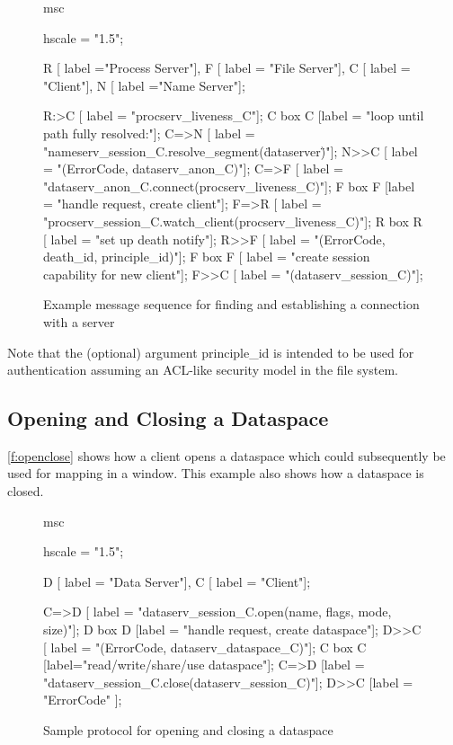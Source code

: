 \begin{figure}[htb]
  \begin{center}
    \begin{msc}
      msc {
        hscale = "1.5";

        R [ label ="Process Server"],
        F [ label = "File Server"],
        C [ label = "Client"],
        N [ label ="Name Server"];

        R:>C [ label = "procserv\_liveness\_C"];
        C box C [label = "loop until path fully resolved:"];
        C=>N [ label = "nameserv\_session\_C.resolve\_segment(\"dataserver\")"];
        N>>C [ label = "(ErrorCode, dataserv\_anon\_C)"];
        C=>F [ label = "dataserv\_anon\_C.connect(procserv\_liveness\_C)"];
        F box F [label = "handle request, create client"];
        F=>R [ label = "procserv\_session\_C.watch\_client(procserv\_liveness\_C)"];
        R box R [ label = "set up death notify"];
        R>>F [ label = "(ErrorCode, death\_id, principle\_id)"];
        F box F [ label = "create session capability for new client"];
        F>>C [ label = "(dataserv\_session\_C)"];
      }
    \end{msc}
  \end{center}
  \caption{Example message sequence for finding and establishing a connection with a server}
  \label{f:estab}
\end{figure}

Note that the (optional) argument principle\_id is intended to be used for authentication assuming an ACL-like security model in the file system.

\pagebreak

\subsection{Opening and Closing a Dataspace}

\autoref{f:openclose} shows how a client opens a dataspace which could subsequently be used for mapping in a window. This example also shows how a dataspace is closed.

\begin{figure}[htb]
  \begin{center}
    \begin{msc}
      msc {
        hscale = "1.5";

        D [ label = "Data Server"],
        C [ label = "Client"];

        C=>D [ label = "dataserv\_session\_C.open(name, flags, mode, size)"];
        D box D [label = "handle request, create dataspace"];
        D>>C [ label = "(ErrorCode, dataserv\_dataspace\_C)"];
        C box C [label="read/write/share/use dataspace"];
        C=>D [label = "dataserv\_session\_C.close(dataserv\_session\_C)"];
        D>>C [label = "ErrorCode" ];
      }
    \end{msc}
  \end{center}
  \caption{Sample protocol for opening and closing a dataspace}
  \label{f:openclose}
\end{figure}


